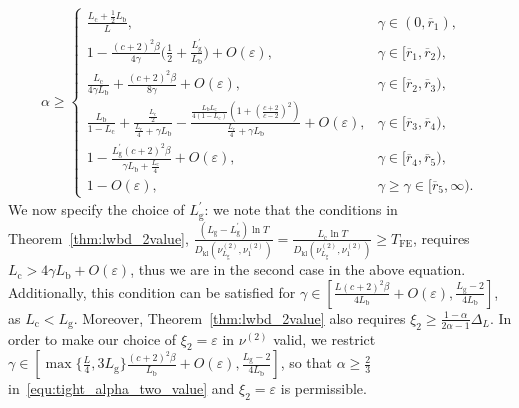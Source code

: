 \documentclass[twoside,11pt]{article}
\newcommand{\kl}{D_{\mathrm{kl}}}
\newcommand{\rmb}{\mathrm{b}}
\newcommand{\rmc}{\mathrm{c}}
\newcommand{\rmg}{\mathrm{g}}
\newcommand{\Tfe}{T_{\mathrm{FE}}}
\begin{document}
\begin{align}\label{equ:tight_alpha_two_value_alt2}
    \alpha \geq
    \begin{cases}
        \frac{L_{\rmc}+\frac{1}{2}L_{\rmb}}{L},
        &
            \gamma \in (0,\overline{r}_1),
        \\
        1-\frac{(c+2)^2\beta}{4\gamma}\Big(\frac{1}{2}+\frac{L_{\rmg}^\prime}{L_{\rmb}}\Big) +O(\varepsilon),
        &
           \gamma \in [\overline{r}_1,\overline{r}_2),
        \\
        \frac{L_{\rmc}}{4\gamma L_{\rmb}}+ \frac{(c+2)^2\beta}{8\gamma} +O(\varepsilon),
        &
             \gamma \in [\overline{r}_2,\overline{r}_3),
        \\
        \frac{L_{\rmb}}{1-L_{\rmc}} + \frac{\frac{L_{\rmc}}{2}}{\frac{L_{\rmc}}{4}+\gamma L_{\rmb}}
        -\frac{\frac{L_{\rmb} L_{\rmc}}{4(1-L_{\rmc})}(1+(\frac{c+2}{c-2})^2)}{\frac{L_{\rmc}}{4}+\gamma L_{\rmb}} +O(\varepsilon),
        & 
              \gamma \in [\overline{r}_3,\overline{r}_4),
         \\
         1-\frac{L_{\rmg}^\prime(c+2)^2\beta}{\gamma L_{\rmb}+\frac{L_{\rmc}}{4}} +O(\varepsilon),
        & 
             \gamma \in [\overline{r}_4,\overline{r}_5),
        \\
         1-O(\varepsilon),
        & 
            \gamma \geq   \gamma \in [\overline{r}_5,\infty).
    \end{cases}
\end{align}
We now specify the choice of $L_{\rmg}^\prime$: we note that the conditions in Theorem~\ref{thm:lwbd_2value}, $\frac{(L_{\rmg}-L_{\rmg}^\prime)\ln T}{\kl(\nu_{L_{\rmg}}^{(2)},\nu_1^{(2)})}=\frac{L_{\rmc}\ln T}{\kl(\nu_{L_{\rmg}}^{(2)},\nu_1^{(2)})}\geq \Tfe$, requires
$L_{\rmc}>4\gamma L_{\rmb}+O(\varepsilon)$, thus we are in the second case in the above equation. 
Additionally, this condition can be satisfied for $\gamma\in[\frac{L(c+2)^2\beta}{4L_{\rmb}}+O(\varepsilon),\frac{L_{\rmg}-2}{4L_{\rmb}}]$, as $L_{\rmc}<L_{\rmg}$.
Moreover, Theorem~\ref{thm:lwbd_2value} also requires $\xi_2\geq \frac{1-\alpha}{2\alpha-1}\Delta_L$. In order to make our choice of $\xi_2=\varepsilon$ in $\nu^{(2)}$ valid, we restrict $\gamma\in[\max\{\frac{L}{4},3L_{\rmg}\}\frac{(c+2)^2\beta}{L_{\rmb}}+O(\varepsilon),\frac{L_{\rmg}-2}{4L_{\rmb}}]$, so that $\alpha\geq \frac{2}{3}$ in~\eqref{equ:tight_alpha_two_value} and $\xi_2=\varepsilon$ is permissible.
\end{document}
